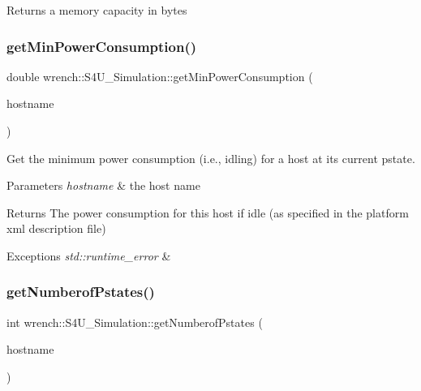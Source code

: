\begin{DoxyReturn}{Returns}
a memory capacity in bytes 
\end{DoxyReturn}
\mbox{\label{classwrench_1_1_s4_u___simulation_a833e019cc24b6e8d99446211d4061b13}} 
\subsubsection{\texorpdfstring{get\+Min\+Power\+Consumption()}{getMinPowerConsumption()}}
{\footnotesize\ttfamily double wrench\+::\+S4\+U\+\_\+\+Simulation\+::get\+Min\+Power\+Consumption (\begin{DoxyParamCaption}\item[{const std\+::string \&}]{hostname }\end{DoxyParamCaption})\hspace{0.3cm}{\ttfamily [static]}}



Get the minimum power consumption (i.\+e., idling) for a host at its current pstate. 


\begin{DoxyParams}{Parameters}
{\em hostname} & the host name \\
\hline
\end{DoxyParams}
\begin{DoxyReturn}{Returns}
The power consumption for this host if idle (as specified in the platform xml description file) 
\end{DoxyReturn}

\begin{DoxyExceptions}{Exceptions}
{\em std\+::runtime\+\_\+error} & \\
\hline
\end{DoxyExceptions}
\mbox{\label{classwrench_1_1_s4_u___simulation_ae3ad786868ba97b98e4414c521eefabf}} 
\subsubsection{\texorpdfstring{get\+Numberof\+Pstates()}{getNumberofPstates()}}
{\footnotesize\ttfamily int wrench\+::\+S4\+U\+\_\+\+Simulation\+::get\+Numberof\+Pstates (\begin{DoxyParamCaption}\item[{const std\+::string \&}]{hostname }\end{DoxyParamCaption})\hspace{0.3cm}{\ttfamily [static]}}



